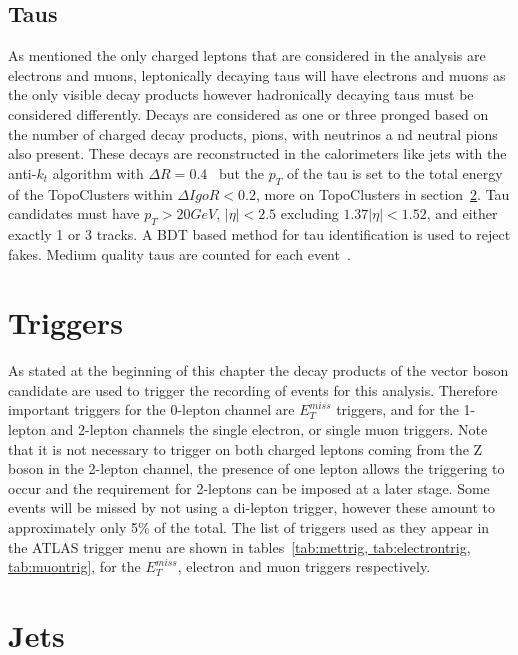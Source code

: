 \subsection{Taus}

As mentioned the only charged leptons that are considered in the analysis are
electrons and muons, leptonically decaying taus will have electrons and muons as
the only visible decay products however hadronically decaying taus must be
considered differently. Decays are considered as one or three pronged based on
the number of charged decay products, pions, with neutrinos a
nd neutral pions
also present. These decays are reconstructed in the calorimeters like jets with
the anti-$k_t$ algorithm with $\Delta R = 0.4$~\cite{tau-reco} but the $p_T$ of
the tau is set to the total energy of the TopoClusters within $\Delta I goR < 0.2$,
more on TopoClusters in section~\ref{sec:jets}. Tau candidates must have $p_T >
20 GeV$, $\lvert  \eta \rvert < 2.5$ excluding $1.37 \lvert \eta \rvert < 1.52$,
and either exactly 1 or 3 tracks. A BDT based method for tau identification is
used to reject fakes. Medium quality taus are counted for each event~\cite{med-taus2}.

\section{Triggers}
\label{sec:triggers}

As stated at the beginning of this chapter the decay products of the vector
boson candidate are used to trigger the recording of events for this analysis.
Therefore important triggers for the 0-lepton channel are $E_T^{miss}$ triggers,
and for the 1-lepton and 2-lepton channels the single electron, or single muon
triggers. Note that it is not necessary to trigger on both charged leptons
coming from the Z boson in the 2-lepton channel, the presence of one lepton
allows the triggering to occur and the requirement for 2-leptons can be imposed
at a later stage. Some events will be missed by not using a di-lepton trigger,
however these amount to approximately only 5\% of the total. The list of
triggers used as they appear in the ATLAS trigger menu are shown in
tables~\ref{tab:mettrig, tab:electrontrig, tab:muontrig}, for the $E_T^{miss}$,
electron and muon triggers respectively.


%
%

\section{Jets}
\label{sec:jets}


